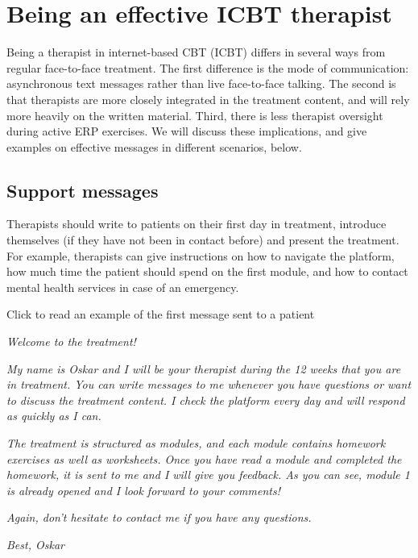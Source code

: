 \documentclass[]{book}
\begin{document}
\hypertarget{being-an-effective-icbt-therapist}{%
\chapter{Being an effective ICBT therapist}\label{being-an-effective-icbt-therapist}}

Being a therapist in internet-based CBT (ICBT) differs in several ways from regular face-to-face treatment. The first difference is the mode of communication: asynchronous text messages rather than live face-to-face talking. The second is that therapists are more closely integrated in the treatment content, and will rely more heavily on the written material. Third, there is less therapist oversight during active ERP exercises. We will discuss these implications, and give examples on effective messages in different scenarios, below.

\hypertarget{support-messages}{%
\section{Support messages}\label{support-messages}}

Therapists should write to patients on their first day in treatment, introduce themselves (if they have not been in contact before) and present the treatment. For example, therapists can give instructions on how to navigate the platform, how much time the patient should spend on the first module, and how to contact mental health services in case of an emergency.

 Click to read an example of the first message sent to a patient

\emph{Welcome to the treatment!}

\emph{My name is Oskar and I will be your therapist during the 12 weeks that you are in treatment. You can write messages to me whenever you have questions or want to discuss the treatment content. I check the platform every day and will respond as quickly as I can.}

\emph{The treatment is structured as modules, and each module contains homework exercises as well as worksheets. Once you have read a module and completed the homework, it is sent to me and I will give you feedback. As you can see, module 1 is already opened and I look forward to your comments!}

\emph{Again, don't hesitate to contact me if you have any questions.}

\emph{Best, Oskar}
\end{document}

